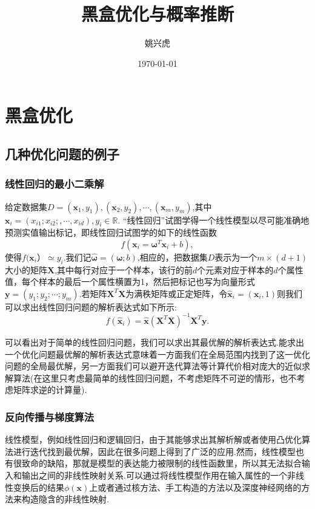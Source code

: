 \documentclass{ctexart}
\title{黑盒优化与概率推断}
\author{姚兴虎}
\date{\today}
\begin{document}
	
\maketitle
\section{黑盒优化}
\subsection{几种优化问题的例子}
\subsubsection{线性回归的最小二乘解}
给定数据集$D={(\mathbf{x}_1,y_1),(\mathbf{x}_2,y_2),\cdots,(\mathbf{x}_m,y_m)}$,其中$\mathbf{x}_i =(x_{i1};x_{i2};,\cdots,x_{id}),y_i \in \mathbb{R}.$ “线性回归”试图学得一个线性模型以尽可能准确地预测实值输出标记，即线性回归试图学的如下的线性函数
\begin{equation*}
f(\mathbf{x}_i=\boldsymbol{\omega}^T\mathbf{x}_i + b),
\end{equation*}
使得$f(\mathbf{x}_i）\simeq y_i$.我们记$\hat{\boldsymbol{\omega}}=(\boldsymbol{\omega};b)$,相应的，把数据集$D$表示为一个$m\times(d+1)$大小的矩阵$\mathbf{X}$,其中每行对应于一个样本，该行的前$d$个元素对应于样本的$d$个属性值，每个样本的最后一个属性横置为1，然后把标记也写为向量形式$\mathbf{y}=(y_1;y_2;\cdots;y_m)$.若矩阵$\mathbf{X}^T\mathbf{X}$为满秩矩阵或正定矩阵，令$\hat{\mathbf{x}}_i=(\mathbf{x}_i,1)$则我们可以求出线性回归问题的解析表达式如下所示:
\begin{equation*}
f(\hat{\mathbf{x}}_i) = \hat{\mathbf{x}}(\mathbf{X}^T\mathbf{X})^{-1}\mathbf{X}^T\mathbf{y}.
\end{equation*}


可以看出对于简单的线性回归问题，我们可以求出其最优解的解析表达式.能求出一个优化问题最优解的解析表达式意味着一方面我们在全局范围内找到了这一优化问题的全局最优解，另一方面我们可以避开迭代算法等计算代价相对庞大的近似求解算法(在这里只考虑最简单的线性回归问题，不考虑矩阵不可逆的情形，也不考虑矩阵求逆的计算量).\cite{周志华2016机器学习}
\subsubsection{反向传播与梯度算法}
线性模型，例如线性回归和逻辑回归，由于其能够求出其解析解或者使用凸优化算法进行迭代找到最优解，因此在很多问题上得到了广泛的应用.然而，线性模型也有很致命的缺陷，那就是模型的表达能力被限制的线性函数里，所以其无法拟合输入和输出之间的非线性映射关系.可以通过将线性模型作用在输入属性的一个非线性变换后的结果$\phi(\mathbf{x})$上或者通过核方法、手工构造的方法以及深度神经网络的方法来构造隐含的非线性映射.
\end{document}
